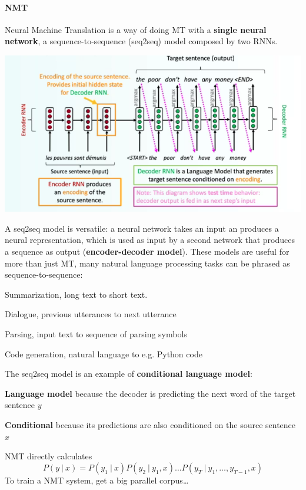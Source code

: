 \documentclass[10pt]{report}
\begin{document}
\paragraph{NMT} Neural Machine Translation is a way of doing MT with a \textbf{single neural network}, a sequence-to-sequence (seq2seq) model composed by two RNNs.
\begin{center}
	\includegraphics[scale=0.6]{63.png}
\end{center}
A seq2seq model is versatile: a neural network takes an input an produces a neural representation, which is used as input by a second network that produces a sequence as output (\textbf{encoder-decoder model}). These models are useful for more than just MT, many natural language processing tasks can be phrased as sequence-to-sequence:
\begin{list}{}{}
	\item Summarization, long text to short text.
	\item Dialogue, previous utterances to next utterance
	\item Parsing, input text to sequence of parsing symbols
	\item Code generation, natural language to e.g. Python code
\end{list}
The seq2seq model is an example of \textbf{conditional language model}:\begin{list}{}{}
	\item \textbf{Language model} because the decoder is predicting the next word of the target sentence $y$
	\item \textbf{Conditional} because its predictions are also conditioned on the source sentence $x$
\end{list}
NMT directly calculates $$P(y\:|\:x) = P(y_1\:|\:x)P(y_2\:|\:y_1,x)\ldots P(y_T\:|\:y_1,\ldots,y_{T-1},x)$$
To train a NMT system, get a big parallel corpus\ldots
\end{document}
